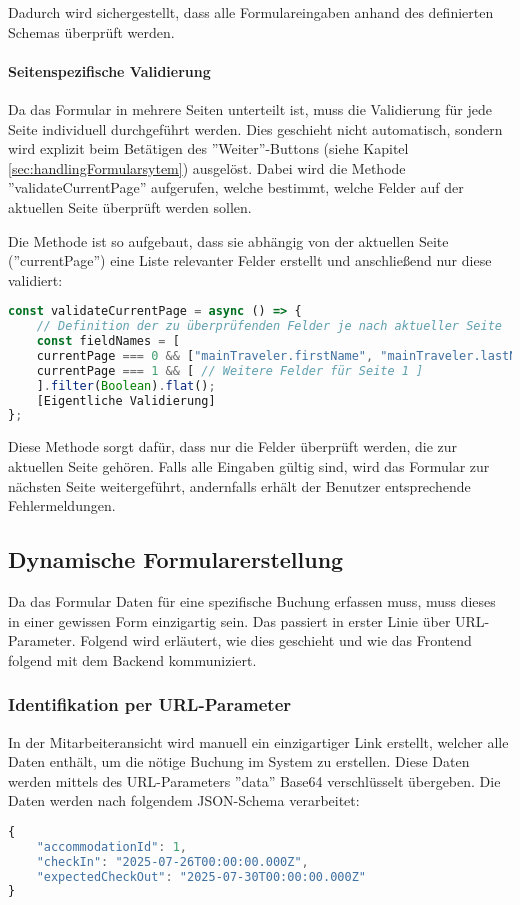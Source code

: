 Dadurch wird sichergestellt, dass alle Formulareingaben anhand des definierten Schemas überprüft werden.

\paragraph{Seitenspezifische Validierung}
Da das Formular in mehrere Seiten unterteilt ist, muss die Validierung für jede Seite individuell durchgeführt werden. Dies geschieht nicht automatisch, sondern wird explizit beim Betätigen des ''Weiter''-Buttons (siehe Kapitel \ref{sec:handlingFormularsytem}) ausgelöst. Dabei wird die Methode ''validateCurrentPage'' aufgerufen, welche bestimmt, welche Felder auf der aktuellen Seite überprüft werden sollen.

Die Methode ist so aufgebaut, dass sie abhängig von der aktuellen Seite (''currentPage'') eine Liste relevanter Felder erstellt und anschließend nur diese validiert:

\begin{lstlisting}[language=JavaScript]
const validateCurrentPage = async () => {
    // Definition der zu überprüfenden Felder je nach aktueller Seite
    const fieldNames = [ 
    currentPage === 0 && ["mainTraveler.firstName", "mainTraveler.lastName", ...],
    currentPage === 1 && [ // Weitere Felder für Seite 1 ]
    ].filter(Boolean).flat();
    [Eigentliche Validierung]
};
\end{lstlisting}

Diese Methode sorgt dafür, dass nur die Felder überprüft werden, die zur aktuellen Seite gehören. Falls alle Eingaben gültig sind, wird das Formular zur nächsten Seite weitergeführt, andernfalls erhält der Benutzer entsprechende Fehlermeldungen.

\subsection{Dynamische Formularerstellung}
Da das Formular Daten für eine spezifische Buchung erfassen muss, muss dieses in einer gewissen Form einzigartig sein. Das passiert in erster Linie über URL-Parameter. Folgend wird erläutert, wie dies geschieht und wie das Frontend folgend mit dem Backend kommuniziert.

\newpage

\subsubsection{Identifikation per URL-Parameter}
In der Mitarbeiteransicht wird manuell ein einzigartiger Link erstellt, welcher alle Daten enthält, um die nötige Buchung im System zu erstellen. Diese Daten werden mittels des URL-Parameters ''data'' Base64 verschlüsselt übergeben. Die Daten werden nach folgendem JSON-Schema verarbeitet:
\begin{lstlisting}[language=JavaScript]
{
    "accommodationId": 1,
    "checkIn": "2025-07-26T00:00:00.000Z",
    "expectedCheckOut": "2025-07-30T00:00:00.000Z"
}
\end{lstlisting}


